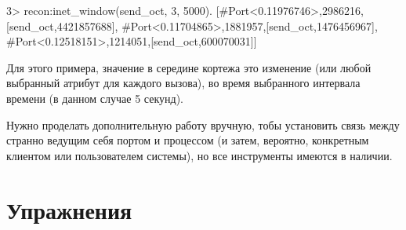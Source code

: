 \begin{VerbatimEshell}
3> recon:inet_window(send_oct, 3, 5000).
[{#Port<0.11976746>,2986216,[{send_oct,4421857688}]},
 {#Port<0.11704865>,1881957,[{send_oct,1476456967}]},
 {#Port<0.12518151>,1214051,[{send_oct,600070031}]}]
\end{VerbatimEshell}

Для этого примера, значение в середине кортежа это изменение  (или любой выбранный атрибут для каждого вызова), во время выбранного интервала времени (в данном случае 5 секунд).

Нужно проделать дополнительную работу вручную, тобы установить связь между странно ведущим себя портом и процессом (и затем, вероятно, конкретным клиентом или пользователем системы), но все инструменты имеются в наличии.


\section{Упражнения}

\subsection*{\ReviewTitle{}}

